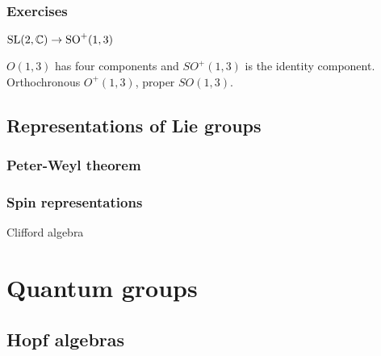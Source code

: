 \documentclass{../note}
\begin{document}
\section*{Exercises}
\begin{prb}
$\mathrm{SL}(2,\mathbb{C})\to\mathrm{SO}^+(1,3)$
\begin{parts}
\item $O(1,3)$ has four components and $SO^+(1,3)$ is the identity component. Orthochronous $O^+(1,3)$, proper $SO(1,3)$.
\end{parts}
\end{prb}

\chapter{Representations of Lie groups}
\section{Peter-Weyl theorem}
\section{Spin representations}
Clifford algebra



\part{Quantum groups}
\chapter{Hopf algebras}
\chapter{}
\end{document}
